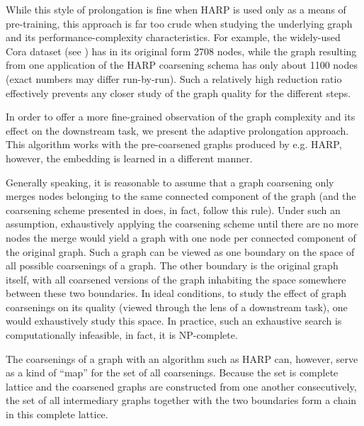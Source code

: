 While this style of prolongation is fine when HARP is used only as a means of pre-training, this approach is far too crude when studying the underlying graph and its performance-complexity characteristics. For example, the widely-used Cora dataset (see \cite{yang_revisiting_2016}) has in its original form 2708 nodes, while the graph resulting from one application of the HARP coarsening schema has only about 1100 nodes (exact numbers may differ run-by-run). Such a relatively high reduction ratio effectively prevents any closer study of the graph quality for the different steps.

In order to offer a more fine-grained observation of the graph complexity and its effect on the downstream task, we present the adaptive prolongation approach. This algorithm works with the pre-coarsened graphs produced by e.g. HARP, however, the embedding is learned in a different manner.

Generally speaking, it is reasonable to assume that a graph coarsening only merges nodes belonging to the same connected component of the graph (and the coarsening scheme presented in \cite{chen_harp_2018} does, in fact, follow this rule). Under such an assumption, exhaustively applying the coarsening scheme until there are no more nodes the merge would yield a graph with one node per connected component of the original graph. Such a graph can be viewed as one boundary on the space of all possible coarsenings of a graph. The other boundary is the original graph itself, with all coarsened versions of the graph inhabiting the space somewhere between these two boundaries. In ideal conditions, to study the effect of graph coarsenings on its quality (viewed through the lens of a downstream task), one would exhaustively study this space. In practice, such an exhaustive search is computationally infeasible, in fact, it is NP-complete.

The coarsenings of a graph with an algorithm such as HARP can, however, serve as a kind of \enquote{map} for the set of all coarsenings. Because the set is complete lattice and the coarsened graphs are constructed from one another consecutively, the set of all intermediary graphs together with the two boundaries form a chain in this complete lattice.

